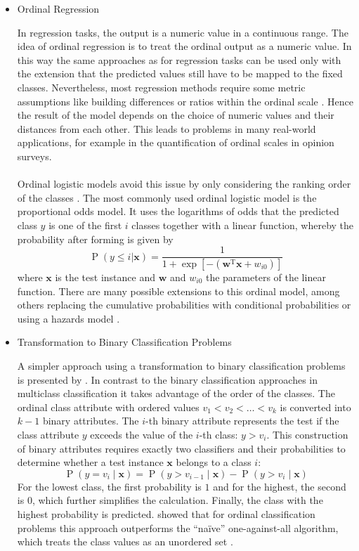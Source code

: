 \documentclass[article,type=msc,colorback,accentcolor=tud7b]{tudthesis}
\begin{document}
    \begin{itemize}
      \item Ordinal Regression

        In regression tasks, the output is a numeric value in a continuous range. The idea of ordinal regression is to treat the ordinal output as a numeric value. In this way the same approaches as for regression tasks can be used only with the extension that the predicted values still have to be mapped to the fixed classes. Nevertheless, most regression methods require some metric assumptions like building differences or ratios within the ordinal scale \autocite[chapter~1]{Ruan2014}. Hence the result of the model depends on the choice of numeric values and their distances from each other. This leads to problems in many real-world applications, for example in the quantification of ordinal scales in opinion surveys. \\\\
        Ordinal logistic models avoid this issue by only considering the ranking order of the classes \autocite[chapter~13]{Harrell2015}. The most commonly used ordinal logistic model is the proportional odds model. It uses the logarithms of odds that the predicted class $y$ is one of the first $i$ classes together with a linear function, whereby the probability after forming is given by
        \[\operatorname{P}(y\leq i|\mathbf{x})=\frac{1}{1+\exp\left[-\left(\mathbf{w}^{\mathrm{T}}\mathbf{x}+w_{i 0}\right)\right]}\]
        where $\mathbf{x}$ is the test instance and $\mathbf{w}$ and $w_{i 0}$ the parameters of the linear function. There are many possible extensions to this ordinal model, among others replacing the cumulative probabilities with conditional probabilities or using a hazards model \autocite[chapter~13]{Harrell2015}. 
      \item Transformation to Binary Classification Problems
      
        A simpler approach using a transformation to binary classification problems is presented by \citeauthor{Frank2001}. In contrast to the binary classification approaches in multiclass classification it takes advantage of the order of the classes. The ordinal class attribute with ordered values $v_{1}<v_{2}<\ldots< v_{k}$ is converted into $k-1$ binary attributes. The $i$-th binary attribute represents the test if the class attribute $y$ exceeds the value of the $i$-th class: $y>v_{i}$. This construction of binary attributes requires exactly two classifiers and their probabilities to determine whether a test instance $\mathbf{x}$ belongs to a class $i$:
        \[\operatorname{P}\left(y=v_{i}\mid\mathbf{x}\right)=\operatorname{P}\left(y>v_{i-1}\mid\mathbf{x}\right)-\operatorname{P}\left(y>v_{i}\mid\mathbf{x}\right)\]
        For the lowest class, the first probability is $1$ and for the highest, the second is $0$, which further simplifies the calculation. Finally, the class with the highest probability is predicted. \citeauthor{Frank2001} showed that for ordinal classification problems this approach outperforms the “naïve” one-against-all algorithm, which treats the class values as an unordered set \autocite{Frank2001}.
    \end{itemize}
  
\end{document}
